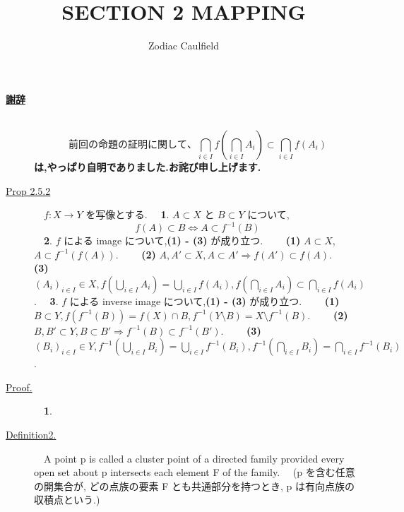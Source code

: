 \documentclass{msjproc}
\begin{document}
	
	\title{{\bf SECTION 2 MAPPING}}
	\author{Zodiac Caulfield}{}
	\maketitle
	
	\begin{description}
		\item[\underline{{\large \bf 謝辞}}]
			　{\bf
					$$
					前回の命題の証明に関して、
					\bigcap_{i \in I} f (\bigcap_{i \in I} A_i)
					\subset \bigcap_{i \in I} f (A_i)
					$$
					は,やっぱり自明でありました.お詫び申し上げます.
				}
	\end{description}

	\begin{description}
		\item[\underline{Prop 2.5.2}]　$f : X \to Y$ を写像とする.
		\newline
			　{\bf 1}. $A \subset X$ と $B \subset Y$ について,
			$$f(A) \subset B \iff A \subset f^{-1}(B)$$
			　{\bf 2}. $f$ による image について,{\bf (1) - (3)} が成り立つ.
			\newline
				　　{\bf (1)} $A \subset X$, $A \subset f^{-1}(f(A))$.
				\newline
				　　{\bf (2)} $A, A' \subset X, A \subset A' \Rightarrow f(A') \subset f(A)$.
				\newline
				　　{\bf (3)} $(A_i)_{i \in I} \in X, 
				f(\bigcup_{i \in I} A_i) = \bigcup_{i \in I} f(A_i), 
				f(\bigcap_{i \in I} A_i) \subset \bigcap_{i \in I} f(A_i)$.
			\newline
			　{\bf 3}. $f$ による inverse image について,{\bf (1) - (3)} が成り立つ.
			\newline
				　　{\bf (1)} $B \subset Y, f(f^{-1}(B)) = f(X) \cap B, 
				f^{-1}(Y \setminus B) = X \setminus f^{-1}(B)$.
				\newline
				　　{\bf (2)} $B, B' \subset Y, B \subset B' \Rightarrow 
				f^{-1}(B) \subset f^{-1}(B')$.
				\newline
				　　{\bf (3)} $(B_i)_{i \in I} \in Y, 
				f^{-1}(\bigcup_{i \in I} B_i) = \bigcup_{i \in I} f^{-1}(B_i), 
				f^{-1}(\bigcap_{i \in I} B_i) = \bigcap_{i \in I} f^{-1}(B_i)$.
		\newline
		\item[\underline{Proof.}]
			　{\bf 1}. 
	\end{description}

	\begin{description}
		\item[\underline{Definition2.}]
		　A point p is called a cluster point of a directed 
		family provided every open set about p intersects each element F of the family.
		\newline
		　(p を含む任意の開集合が, どの点族の要素 F とも共通部分を持つとき, 
		p は有向点族の収積点という.)
	\end{description}
\end{document}

